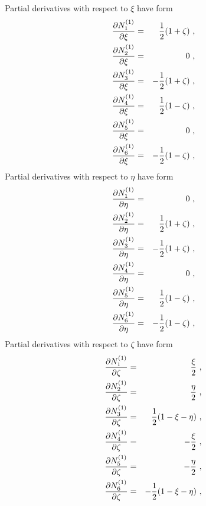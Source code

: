 Partial derivatives with respect to $\xi$ have form
\begin{eqnarray}
\label{bflinweddx1}
\ppd{N_1^{(1)}}{\xi} &=& \del{1}{2} (1 + \zeta)\ ,
\\ \label{bflinweddx2}
\ppd{N_2^{(1)}}{\xi} &=& 0\ ,
\\ \label{bflinweddx3}
\ppd{N_3^{(1)}}{\xi} &=& - \del{1}{2} (1 + \zeta)\ ,
\\ \label{bflinweddx4}
\ppd{N_4^{(1)}}{\xi} &=& \del{1}{2} (1 - \zeta)\ ,
\\ \label{bflinweddx5}
\ppd{N_5^{(1)}}{\xi} &=& 0\ ,
\\ \label{bflinweddx6}
\ppd{N_6^{(1)}}{\xi} &=& - \del{1}{2} (1 - \zeta)\ ,
\end{eqnarray}
Partial derivatives with respect to $\eta$ have form
\begin{eqnarray}
\label{bflinweddy1}
\ppd{N_1^{(1)}}{\eta} &=& 0\ ,
\\ \label{bflinweddy2}
\ppd{N_2^{(1)}}{\eta} &=& \del{1}{2} (1 + \zeta)\ ,
\\ \label{bflinweddy3}
\ppd{N_3^{(1)}}{\eta} &=& - \del{1}{2} (1 + \zeta)\ ,
\\ \label{bflinweddy4}
\ppd{N_4^{(1)}}{\eta} &=& 0\ ,
\\ \label{bflinweddy5}
\ppd{N_5^{(1)}}{\eta} &=& \del{1}{2} (1 - \zeta)\ ,
\\ \label{bflinweddy6}
\ppd{N_6^{(1)}}{\eta} &=& - \del{1}{2} (1 - \zeta)\ ,
\end{eqnarray}
Partial derivatives with respect to $\zeta$ have form
\begin{eqnarray}
\label{bflinweddz1}
\ppd{N_1^{(1)}}{\zeta} &=& \del{\xi}{2}\ ,
\\ \label{bflinweddz2}
\ppd{N_2^{(1)}}{\zeta} &=& \del{\eta}{2}\ ,
\\ \label{bflinweddz3}
\ppd{N_3^{(1)}}{\zeta} &=& \del{1}{2} (1 - \xi - \eta)\ ,
\\ \label{bflinweddz4}
\ppd{N_4^{(1)}}{\zeta} &=& - \del{\xi}{2}\ ,
\\ \label{bflinweddz5}
\ppd{N_5^{(1)}}{\zeta} &=& - \del{\eta}{2}\ ,
\\ \label{bflinweddz6}
\ppd{N_6^{(1)}}{\zeta} &=& - \del{1}{2} (1 - \xi - \eta)\ ,
\end{eqnarray}

